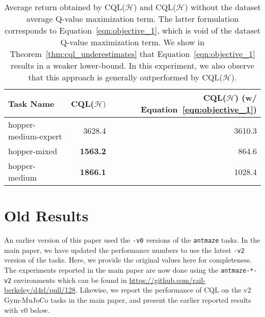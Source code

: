 \begin{table}[h]
    \centering
    \begin{tabular}{l|r|r}
    \hline
        \textbf{Task Name} & \textbf{CQL($\mathcal{H})$} & \textbf{CQL($\mathcal{H}$) (w/ Equation~\ref{eqn:objective_1})} \\
        \hline
        hopper-medium-expert & 3628.4 & 3610.3 \\
        hopper-mixed & \textbf{1563.2} & 864.6 \\
        hopper-medium & \textbf{1866.1} & 1028.4 \\
        \hline
    \end{tabular}
    \caption{{\small Average return obtained by CQL($\mathcal{H}$) and CQL($\mathcal{H}$) without the dataset average Q-value maximization term. The latter formulation corresponds to Equation~\ref{eqn:objective_1}, which is void of the dataset Q-value maximization term. We show in Theorem~\ref{thm:cql_underestimates} that Equation~\ref{eqn:objective_1} results in a weaker lower-bound. In this experiment, we also observe that this approach is generally outperformed by CQL($\mathcal{H}$).}}
    \vspace{-15pt}
    \label{table:data_subtract}
\end{table}

\section{Old Results}
\label{sec:old_results}

An earlier version of this paper used the \texttt{-v0} versions of the \texttt{antmaze} tasks. In the main paper, we have updated the performance numbers to use the latest \texttt{-v2} version of the tasks. Here, we provide the original values here for completeness. The experiments reported in the main paper are now done using the \texttt{antmaze-*-v2} environments which can be found in \url{https://github.com/rail-berkeley/d4rl/pull/128}. 
Likewise, we report the performance of CQL on the v2 Gym-MuJoCo tasks in the main paper, and present the earlier reported results with v0 below.       

